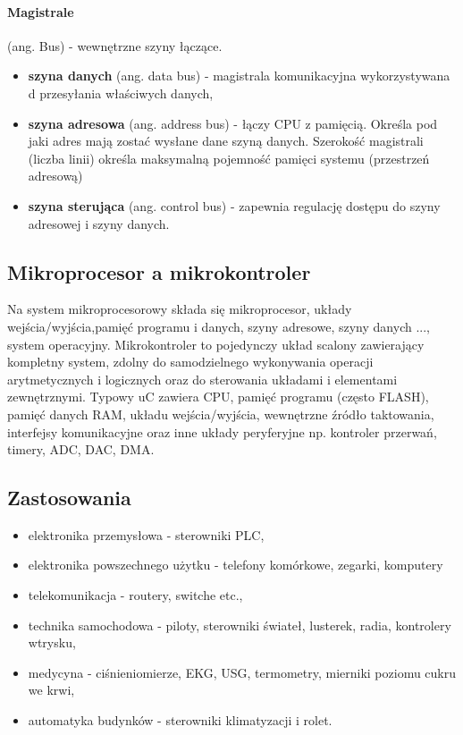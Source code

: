 \documentclass[]{report}
\begin{document}
\paragraph{Magistrale} (ang. Bus) - wewnętrzne szyny łączące.
\begin{itemize}
\item \textbf{szyna danych} (ang. data bus) - magistrala komunikacyjna wykorzystywana d przesyłania właściwych danych,
\item \textbf{szyna adresowa} (ang. address bus) - łączy CPU z pamięcią. Określa pod jaki adres mają zostać wysłane dane szyną danych. Szerokość magistrali (liczba linii) określa maksymalną pojemność pamięci systemu (przestrzeń adresową)
\item \textbf{szyna sterująca} (ang. control bus) - zapewnia regulację dostępu do szyny adresowej i szyny danych.
\end{itemize}

\subsection{Mikroprocesor a mikrokontroler}
Na system mikroprocesorowy składa się mikroprocesor, układy wejścia/wyjścia,pamięć programu i danych, szyny adresowe, szyny danych ..., system operacyjny. Mikrokontroler to pojedynczy układ scalony zawierający kompletny system, zdolny do samodzielnego wykonywania operacji arytmetycznych i logicznych oraz do sterowania układami i elementami zewnętrznymi. Typowy uC zawiera CPU, pamięć programu (często FLASH), pamięć danych RAM, układu wejścia/wyjścia, wewnętrzne źródło taktowania, interfejsy komunikacyjne oraz inne układy peryferyjne np. kontroler przerwań, timery, ADC, DAC, DMA.

\subsection{Zastosowania}
\begin{itemize}
\item elektronika przemysłowa - sterowniki PLC,
\item elektronika powszechnego użytku - telefony komórkowe, zegarki, komputery
\item telekomunikacja - routery, switche etc.,
\item technika samochodowa - piloty, sterowniki świateł, lusterek, radia, kontrolery wtrysku,
\item medycyna - ciśnieniomierze, EKG, USG, termometry, mierniki poziomu cukru we krwi,
\item automatyka budynków - sterowniki klimatyzacji i rolet.
\end{itemize}
\end{document}
